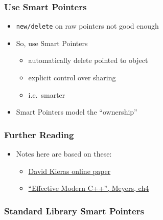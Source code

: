 \hypertarget{use-smart-pointers}{%
\subsubsection{Use Smart Pointers}\label{use-smart-pointers}}

\begin{itemize}
\tightlist
\item
  \texttt{new/delete} on raw pointers not good enough
\item
  So, use Smart Pointers

  \begin{itemize}
  \tightlist
  \item
    automatically delete pointed to object
  \item
    explicit control over sharing
  \item
    i.e.~smarter
  \end{itemize}
\item
  Smart Pointers model the ``ownership''
\end{itemize}

\hypertarget{further-reading}{%
\subsubsection{Further Reading}\label{further-reading}}

\begin{itemize}
\tightlist
\item
  Notes here are based on these:

  \begin{itemize}
  \tightlist
  \item
    \href{http://www.umich.edu/~eecs381/handouts/C++11_smart_ptrs.pdf}{David
    Kieras online paper}
  \item
    \href{https://www.amazon.co.uk/Effective-Modern-Specific-Ways-Improve/dp/1491903996/ref=sr_1_1?ie=UTF8\&qid=1484571499\&sr=8-1\&keywords=Effective+Modern+C\%2B\%2B}{``Effective
    Modern C++'', Meyers, ch4}
  \end{itemize}
\end{itemize}

\hypertarget{standard-library-smart-pointers}{%
\subsubsection{Standard Library Smart
Pointers}\label{standard-library-smart-pointers}}


